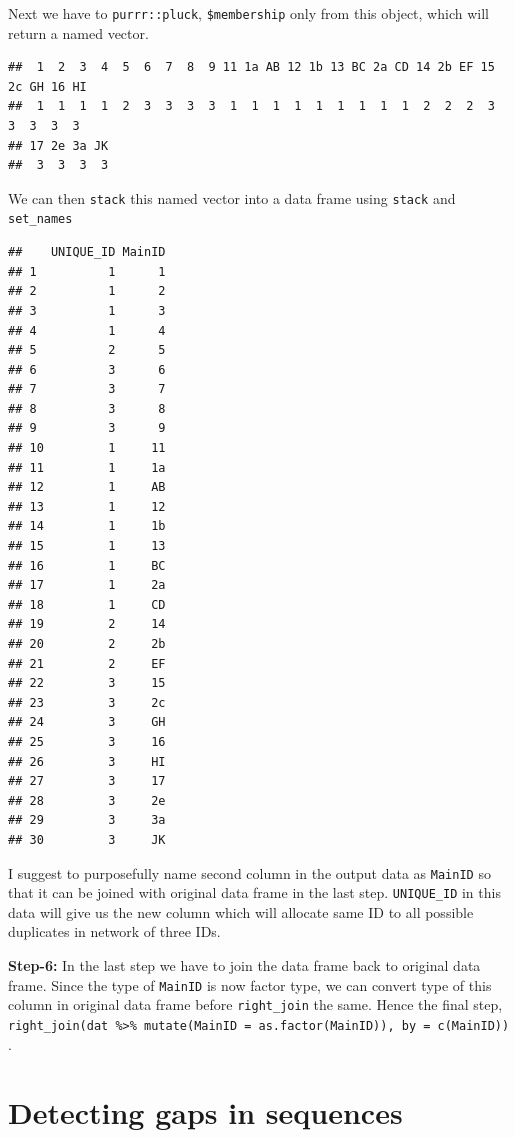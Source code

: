 \documentclass[
]{book}
\begin{document}
Next we have to \texttt{purrr::pluck}, \texttt{\$membership} only from this object, which will return a named vector.

\begin{verbatim}
##  1  2  3  4  5  6  7  8  9 11 1a AB 12 1b 13 BC 2a CD 14 2b EF 15 2c GH 16 HI 
##  1  1  1  1  2  3  3  3  3  1  1  1  1  1  1  1  1  1  2  2  2  3  3  3  3  3 
## 17 2e 3a JK 
##  3  3  3  3
\end{verbatim}

We can then \texttt{stack} this named vector into a data frame using \texttt{stack} and \texttt{set\_names}

\begin{verbatim}
##    UNIQUE_ID MainID
## 1          1      1
## 2          1      2
## 3          1      3
## 4          1      4
## 5          2      5
## 6          3      6
## 7          3      7
## 8          3      8
## 9          3      9
## 10         1     11
## 11         1     1a
## 12         1     AB
## 13         1     12
## 14         1     1b
## 15         1     13
## 16         1     BC
## 17         1     2a
## 18         1     CD
## 19         2     14
## 20         2     2b
## 21         2     EF
## 22         3     15
## 23         3     2c
## 24         3     GH
## 25         3     16
## 26         3     HI
## 27         3     17
## 28         3     2e
## 29         3     3a
## 30         3     JK
\end{verbatim}

I suggest to purposefully name second column in the output data as \texttt{MainID} so that it can be joined with original data frame in the last step. \texttt{UNIQUE\_ID} in this data will give us the new column which will allocate same ID to all possible duplicates in network of three IDs.

\textbf{Step-6:} In the last step we have to join the data frame back to original data frame. Since the type of \texttt{MainID} is now factor type, we can convert type of this column in original data frame before \texttt{right\_join} the same. Hence the final step, \texttt{right\_join(dat\ \%\textgreater{}\%\ mutate(MainID\ =\ as.factor(MainID)),\ by\ =\ c(\textquotesingle{}MainID\textquotesingle{}))}.

\hypertarget{detecting-gaps-in-sequences}{%
\chapter{Detecting gaps in sequences}\label{detecting-gaps-in-sequences}}
\end{document}
